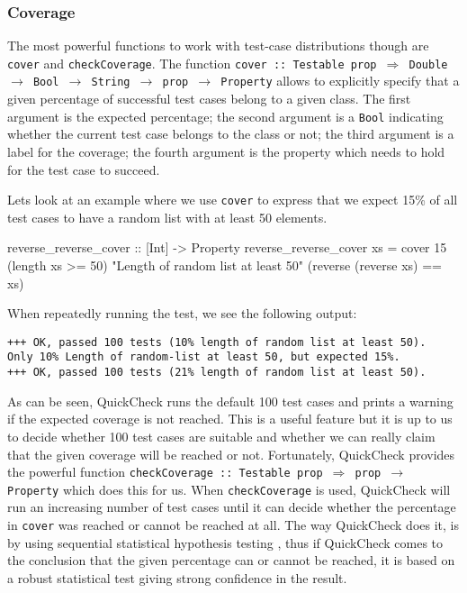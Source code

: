 \subsubsection*{Coverage}
The most powerful functions to work with test-case distributions though are \texttt{cover} and \texttt{checkCoverage}. The function \texttt{cover :: Testable prop $\Rightarrow$ Double $\rightarrow$ Bool $\rightarrow$ String $\rightarrow$ prop $\rightarrow$ Property} allows to explicitly specify that a given percentage of successful test cases belong to a given class. The first argument is the expected percentage; the second argument is a \texttt{Bool} indicating whether the current test case belongs to the class or not; the third argument is a label for the coverage; the fourth argument is the property which needs to hold for the test case to succeed. 

Lets look at an example where we use \texttt{cover} to express that we expect 15\% of all test cases to have a random list with at least 50 elements.

\begin{HaskellCode}
reverse_reverse_cover :: [Int] -> Property
reverse_reverse_cover xs  
  = cover 15 (length xs >= 50) "Length of random list at least 50"
             (reverse (reverse xs) == xs)
\end{HaskellCode}

When repeatedly running the test, we see the following output:

\begin{verbatim}
+++ OK, passed 100 tests (10% length of random list at least 50).
Only 10% Length of random-list at least 50, but expected 15%.
+++ OK, passed 100 tests (21% length of random list at least 50).
\end{verbatim}

As can be seen, QuickCheck runs the default 100 test cases and prints a warning if the expected coverage is not reached. This is a useful feature but it is up to us to decide whether 100 test cases are suitable and whether we can really claim that the given coverage will be reached or not. Fortunately, QuickCheck provides the powerful function \texttt{checkCoverage :: Testable prop $\Rightarrow$ prop $\rightarrow$ Property} which does this for us. When \texttt{checkCoverage} is used, QuickCheck will run an increasing number of test cases until it can decide whether the percentage in \texttt{cover} was reached or cannot be reached at all. The way QuickCheck does it, is by using sequential statistical hypothesis testing \cite{wald_sequential_1992}, thus if QuickCheck comes to the conclusion that the given percentage can or cannot be reached, it is based on a robust statistical test giving strong confidence in the result.

